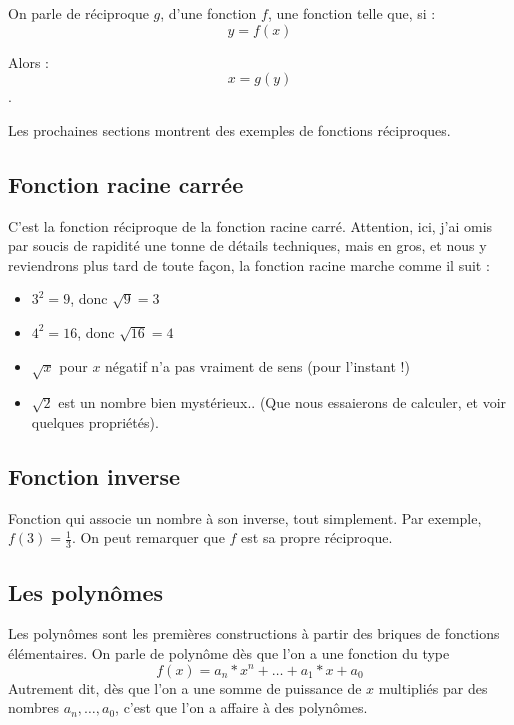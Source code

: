 \documentclass[french,]{article}
\providecommand{\tightlist}{%
  \setlength{\itemsep}{0pt}\setlength{\parskip}{0pt}}
\begin{document}
On parle de réciproque \(g\), d'une fonction \(f\), une fonction telle
que, si : \[ y = f(x) \]

Alors : \[ x = g(y) \].

Les prochaines sections montrent des exemples de fonctions réciproques.

\hypertarget{fonction-racine-carruxe9e}{%
\subsection{Fonction racine carrée}\label{fonction-racine-carruxe9e}}

C'est la fonction réciproque de la fonction racine carré. Attention,
ici, j'ai omis par soucis de rapidité une tonne de détails techniques,
mais en gros, et nous y reviendrons plus tard de toute façon, la
fonction racine marche comme il suit :

\begin{itemize}
\tightlist
\item
  \(3^2 = 9\), donc \(\sqrt{9} = 3\)
\item
  \(4^2 = 16\), donc \(\sqrt{16} = 4\)
\item
  \(\sqrt{x}\) pour \(x\) négatif n'a pas vraiment de sens (pour
  l'instant !)
\item
  \(\sqrt{2}\) est un nombre bien mystérieux.. (Que nous essaierons de
  calculer, et voir quelques propriétés).
\end{itemize}

\hypertarget{fonction-inverse}{%
\subsection{Fonction inverse}\label{fonction-inverse}}

Fonction qui associe un nombre à son inverse, tout simplement. Par
exemple, \(f(3) = \frac{1}{3}\). On peut remarquer que \(f\) est sa
propre réciproque.

\hypertarget{les-polynuxf4mes}{%
\subsection{Les polynômes}\label{les-polynuxf4mes}}

Les polynômes sont les premières constructions à partir des briques de
fonctions élémentaires. On parle de polynôme dès que l'on a une fonction
du type \[ f(x) = a_n * x^n + \dots + a_1 *x + a_0 \] Autrement dit, dès
que l'on a une somme de puissance de \(x\) multipliés par des nombres
\(a_n, \dots, a_0\), c'est que l'on a affaire à des polynômes.
\end{document}
